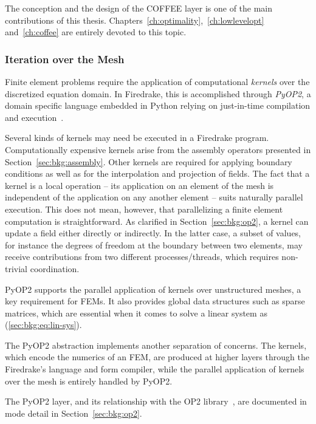 The conception and the design of the COFFEE layer is one of the main contributions of this thesis. Chapters~\ref{ch:optimality},~\ref{ch:lowlevelopt} and~\ref{ch:coffee} are entirely devoted to this topic.

\subsubsection{Iteration over the Mesh}
\label{sec:bkg:meshiteration}
Finite element problems require the application of computational {\em kernels} over the discretized equation domain. In Firedrake, this is accomplished through {\em PyOP2}, a domain specific language embedded in Python relying on just-in-time compilation and execution~\citep{pyop2isc}. 

Several kinds of kernels may need be executed in a Firedrake program. Computationally expensive kernels arise from the assembly operators presented in Section~\ref{sec:bkg:assembly}. Other kernels are required for applying boundary conditions as well as for the interpolation and projection of fields. The fact that a kernel is a local operation -- its application on an element of the mesh is independent of the application on any another element -- suits naturally parallel execution. This does not mean, however, that parallelizing a finite element computation is straightforward. As clarified in Section~\ref{sec:bkg:op2}, a kernel can update a field either directly or indirectly. In the latter case, a subset of values, for instance the degrees of freedom at the boundary between two elements, may receive contributions from two different processes/threads, which requires non-trivial coordination.

PyOP2 supports the parallel application of kernels over unstructured meshes, a key requirement for FEMs. It also provides global data structures such as sparse matrices, which are essential when it comes to solve a linear system as (\ref{sec:bkg:eq:lin-sys}).

The PyOP2 abstraction implements another separation of concerns. The kernels, which encode the numerics of an FEM, are produced at higher layers through the Firedrake's language and form compiler, while the parallel application of kernels over the mesh is entirely handled by PyOP2. 

The PyOP2 layer, and its relationship with the OP2 library~\cite{op2-main}, are documented in mode detail in Section~\ref{sec:bkg:op2}.


